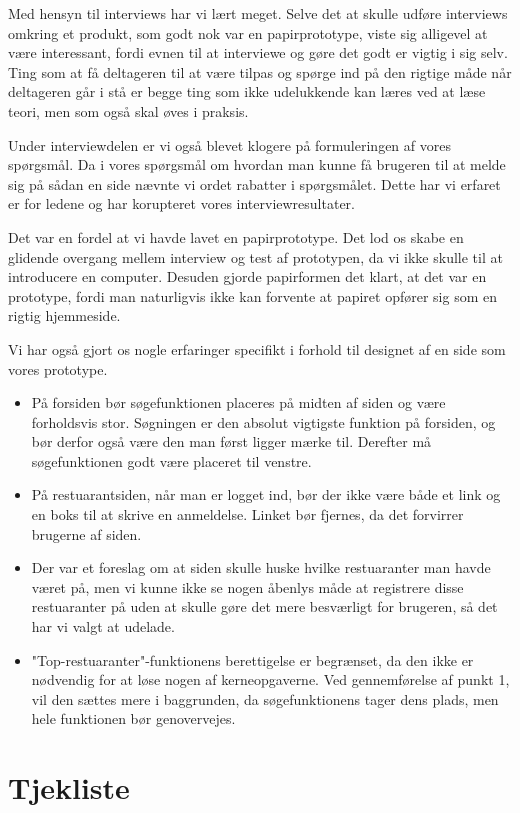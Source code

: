 \documentclass[a4paper, 12pt]{article}
\begin{document}
Med hensyn til interviews har vi lært meget. Selve det at skulle udføre interviews omkring et produkt, som godt nok var en papirprototype, viste sig alligevel at være interessant, fordi evnen til at interviewe og gøre det godt er vigtig i sig selv. Ting som at få deltageren til at være tilpas og spørge ind på den rigtige måde når deltageren går i stå er begge ting som ikke udelukkende kan læres ved at læse teori, men som også skal øves i praksis.

Under interviewdelen er vi også blevet klogere på formuleringen af vores spørgsmål. 
Da i vores spørgsmål om hvordan man kunne få brugeren til at melde sig på sådan en side nævnte vi ordet rabatter i spørgsmålet. Dette har vi erfaret er for ledene og har korupteret vores interviewresultater.

Det var en fordel at vi havde lavet en papirprototype. Det lod os skabe en glidende overgang mellem interview og test af prototypen, da vi ikke skulle til at introducere en computer. Desuden gjorde papirformen det klart, at det var en prototype, fordi man naturligvis ikke kan forvente at papiret opfører sig som en rigtig hjemmeside.

Vi har også gjort os nogle erfaringer specifikt i forhold til designet af en side som vores prototype.
\begin{itemize}
\item På forsiden bør søgefunktionen placeres på midten af siden og være forholdsvis stor. Søgningen er den absolut vigtigste funktion på forsiden, og bør derfor også være den man først ligger mærke til. Derefter må søgefunktionen godt være placeret til venstre.
\item På restuarantsiden, når man er logget ind, bør der ikke være både et link og en boks til at skrive en anmeldelse. Linket bør fjernes, da det forvirrer brugerne af siden.
\item Der var et foreslag om at siden skulle huske hvilke restuaranter man havde været på, men vi kunne ikke se nogen åbenlys måde at registrere disse restuaranter på uden at skulle gøre det mere besværligt for brugeren, så det har vi valgt at udelade.
\item "Top-restuaranter"-funktionens berettigelse er begrænset, da den ikke er nødvendig for at løse nogen af kerneopgaverne. Ved gennemførelse af punkt 1, vil den sættes mere i baggrunden, da søgefunktionens tager dens plads, men hele funktionen bør genovervejes.
\end{itemize}
\clearpage
\appendix

\section{Tjekliste}
\label{appx:tjekliste}
\end{document}
